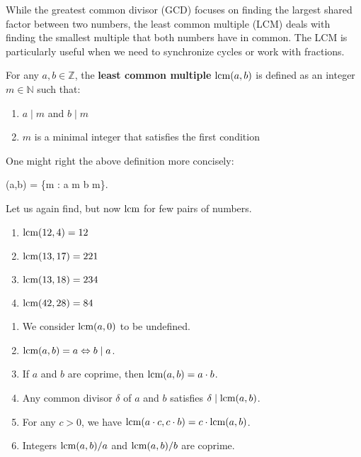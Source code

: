 \documentclass[../lecture-notes-148x210.tex]{subfiles}
\begin{document}
While the greatest common divisor (GCD) focuses on finding the largest shared factor between two numbers, the least common multiple (LCM) deals with finding the smallest multiple that both numbers have in common. The LCM is particularly useful when we need to synchronize cycles or work with fractions.

\begin{definition}[LCM]
    For any $a, b \in \mathbb{Z}$, the \textbf{least common multiple} $\text{lcm}(a,
    b)$ is defined as an integer $m \in \mathbb{N}$ such that:
    \begin{enumerate}
        \item $a \mid m$ and $b \mid m$
        \item $m$ is a minimal integer that satisfies the first condition 
    \end{enumerate}

    One might right the above definition more concisely:
    \begin{xequation}
        \lcm(a,b) = \min\{m \in {}: a \mid m \;  \; b \mid m\}.
    \end{xequation}
\end{definition}

\begin{example}
    Let us again find, but now $\text{lcm}$ for few pairs of numbers.
    \hfill
    \begin{xmulticols}{2}
        \begin{enumerate}
            \item $\text{lcm}(12, 4) = 12$
            \item $\text{lcm}(13, 17) = 221$
            \item $\text{lcm}(13, 18) = 234$
            \item $\text{lcm}(42, 28) = 84$
        \end{enumerate}
    \end{xmulticols}
\end{example}

\begin{lemma} 
    \hfil
    \begin{enumerate}
        \item We consider $\text{lcm}(a, 0)$ to be undefined.
        \item $\text{lcm}(a, b) = a \Leftrightarrow b \mid a$.
        \item If $a$ and $b$ are coprime, then $\text{lcm}(a, b) = a \cdot b$.
        \item Any common divisor $\delta$ of $a$ and $b$ satisfies $\delta \mid \text{lcm}(a, b)$.
        \item For any $c > 0$, we have $\text{lcm}(a \cdot c, c \cdot b) =  c \cdot \text{lcm}(a, b)$.
        \item Integers $\text{lcm}(a, b)/a$ and $\text{lcm}(a, b) / b$ are coprime.
    \end{enumerate}
\end{lemma}
\end{document}
